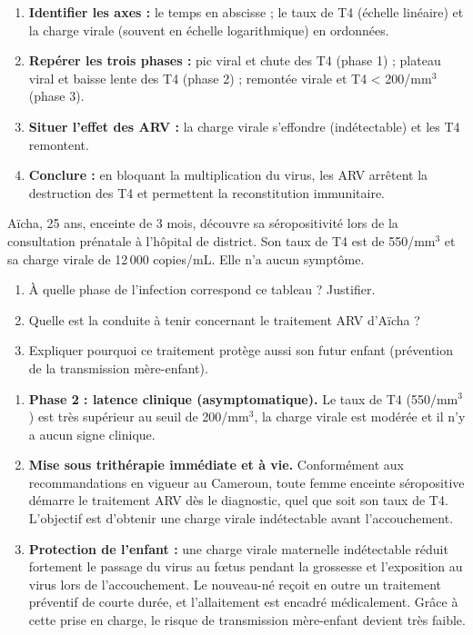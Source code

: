 \documentclass[11pt]{article}
\begin{document}
\begin{methode}
\begin{enumerate}
    \item \textbf{Identifier les axes :} le temps en abscisse ; le taux de T4 (échelle linéaire) et la charge virale (souvent en échelle logarithmique) en ordonnées.
    \item \textbf{Repérer les trois phases :} pic viral et chute des T4 (phase 1) ; plateau viral et baisse lente des T4 (phase 2) ; remontée virale et T4 < 200/mm$^3$ (phase 3).
    \item \textbf{Situer l'effet des ARV :} la charge virale s'effondre (indétectable) et les T4 remontent.
    \item \textbf{Conclure :} en bloquant la multiplication du virus, les ARV arrêtent la destruction des T4 et permettent la reconstitution immunitaire.
\end{enumerate}
\end{methode}

\begin{exercice}
Aïcha, 25 ans, enceinte de 3 mois, découvre sa séropositivité lors de la consultation prénatale à l'hôpital de district. Son taux de T4 est de 550/mm$^3$ et sa charge virale de 12\,000 copies/mL. Elle n'a aucun symptôme.
\begin{enumerate}
    \item À quelle phase de l'infection correspond ce tableau ? Justifier.
    \item Quelle est la conduite à tenir concernant le traitement ARV d'Aïcha ?
    \item Expliquer pourquoi ce traitement protège aussi son futur enfant (prévention de la transmission mère-enfant).
\end{enumerate}
\end{exercice}

\begin{corrige}
\begin{enumerate}
    \item \textbf{Phase 2 : latence clinique (asymptomatique).} Le taux de T4 (550/mm$^3$) est très supérieur au seuil de 200/mm$^3$, la charge virale est modérée et il n'y a aucun signe clinique.
    \item \textbf{Mise sous trithérapie immédiate et à vie.} Conformément aux recommandations en vigueur au Cameroun, toute femme enceinte séropositive démarre le traitement ARV dès le diagnostic, quel que soit son taux de T4. L'objectif est d'obtenir une charge virale indétectable avant l'accouchement.
    \item \textbf{Protection de l'enfant :} une charge virale maternelle indétectable réduit fortement le passage du virus au fœtus pendant la grossesse et l'exposition au virus lors de l'accouchement. Le nouveau-né reçoit en outre un traitement préventif de courte durée, et l'allaitement est encadré médicalement. Grâce à cette prise en charge, le risque de transmission mère-enfant devient très faible.
\end{enumerate}
\end{corrige}
\end{document}
